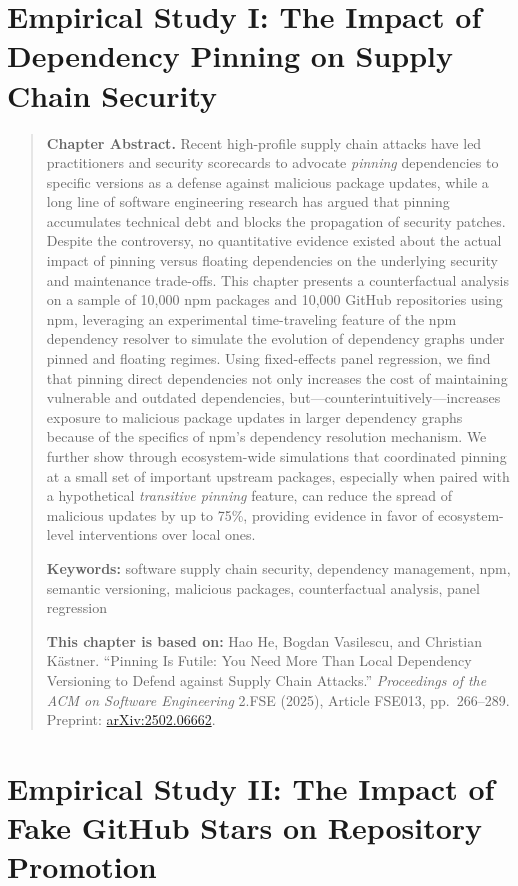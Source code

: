 \documentclass[12pt, openany]{cmuthesis}
\newcommand{\chapterfrontmatter}[3]{%
    \vspace{1em}%
    \begingroup
    \begin{quote}
    \noindent\textbf{Chapter Abstract.} #1\par
    \vspace{0.8em}%
    \noindent\textbf{Keywords:} #2\par
    \vspace{0.8em}%
    \noindent\textbf{This chapter is based on:} #3\par
    \end{quote}
    \endgroup
    \vspace{1em}%
}
\begin{document}


\chapter{Empirical Study I: The Impact of Dependency Pinning on Supply Chain Security}
\label{chp:pinning}

\chapterfrontmatter{%
Recent high-profile supply chain attacks have led practitioners and security scorecards to advocate \emph{pinning} dependencies to specific versions as a defense against malicious package updates, while a long line of software engineering research has argued that pinning accumulates technical debt and blocks the propagation of security patches.
Despite the controversy, no quantitative evidence existed about the actual impact of pinning versus floating dependencies on the underlying security and maintenance trade-offs.
This chapter presents a counterfactual analysis on a sample of 10{,}000 npm packages and 10{,}000 GitHub repositories using npm, leveraging an experimental time-traveling feature of the npm dependency resolver to simulate the evolution of dependency graphs under pinned and floating regimes.
Using fixed-effects panel regression, we find that pinning direct dependencies not only increases the cost of maintaining vulnerable and outdated dependencies, but---counterintuitively---increases exposure to malicious package updates in larger dependency graphs because of the specifics of npm's dependency resolution mechanism.
We further show through ecosystem-wide simulations that coordinated pinning at a small set of important upstream packages, especially when paired with a hypothetical \emph{transitive pinning} feature, can reduce the spread of malicious updates by up to 75\%, providing evidence in favor of ecosystem-level interventions over local ones.%
}{%
software supply chain security, dependency management, npm, semantic versioning, malicious packages, counterfactual analysis, panel regression%
}{%
Hao He, Bogdan Vasilescu, and Christian K\"astner.
``Pinning Is Futile: You Need More Than Local Dependency Versioning to Defend against Supply Chain Attacks.''
\emph{Proceedings of the ACM on Software Engineering} 2.FSE (2025), Article FSE013, pp.~266--289.
Preprint: \href{https://arxiv.org/abs/2502.06662}{arXiv:2502.06662}.%
}



\chapter{Empirical Study II: The Impact of Fake GitHub Stars on Repository Promotion}
\label{chp:fake-stars}
\end{document}
